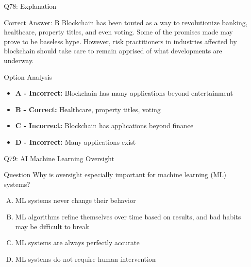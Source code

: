 \documentclass{beamer}
\begin{document}
	\begin{frame}{Q78: Explanation}
		\begin{block}{Correct Answer: B}
			Blockchain has been touted as a way to revolutionize banking, healthcare, property titles, and even voting. Some of the promises made may prove to be baseless hype. However, risk practitioners in industries affected by blockchain should take care to remain apprised of what developments are underway.
		\end{block}
		\begin{block}{Option Analysis}
			\begin{itemize}
				\item \textbf{A - Incorrect:} Blockchain has many applications beyond entertainment
				\item \textbf{B - Correct:} Healthcare, property titles, voting
				\item \textbf{C - Incorrect:} Blockchain has applications beyond finance
				\item \textbf{D - Incorrect:} Many applications exist
			\end{itemize}
		\end{block}
	\end{frame}
	
	\begin{frame}{Q79: AI Machine Learning Oversight}
		\begin{block}{Question}
			Why is oversight especially important for machine learning (ML) systems?
		\end{block}
		\begin{enumerate}[(A)]
			\item ML systems never change their behavior
			\item ML algorithms refine themselves over time based on results, and bad habits may be difficult to break
			\item ML systems are always perfectly accurate
			\item ML systems do not require human intervention
		\end{enumerate}
	\end{frame}
	
\end{document}
